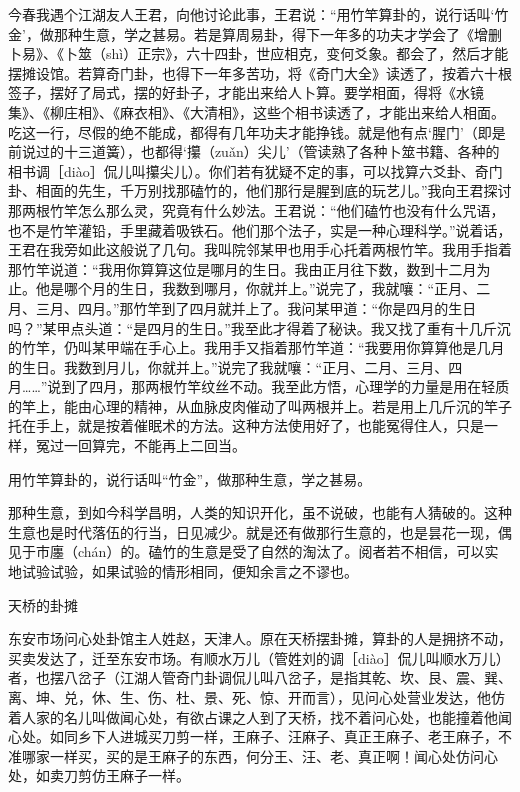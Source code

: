 \documentclass[12pt,UTF8]{ctexbook}
\begin{document}
今春我遇个江湖友人王君，向他讨论此事，王君说：“用竹竿算卦的，说行话叫‘竹金’，做那种生意，学之甚易。若是算周易卦，得下一年多的功夫才学会了《增删卜易》、《卜筮（shì）正宗》，六十四卦，世应相克，变何爻象。都会了，然后才能摆摊设馆。若算奇门卦，也得下一年多苦功，将《奇门大全》读透了，按着六十根签子，摆好了局式，摆的好卦子，才能出来给人卜算。要学相面，得将《水镜集》、《柳庄相》、《麻衣相》、《大清相》，这些个相书读透了，才能出来给人相面。吃这一行，尽假的绝不能成，都得有几年功夫才能挣钱。就是他有点‘腥门’（即是前说过的十三道簧），也都得‘攥（zuǎn）尖儿’（管读熟了各种卜筮书籍、各种的相书调［diào］侃儿叫攥尖儿）。你们若有犹疑不定的事，可以找算六爻卦、奇门卦、相面的先生，千万别找那磕竹的，他们那行是腥到底的玩艺儿。”我向王君探讨那两根竹竿怎么那么灵，究竟有什么妙法。王君说：“他们磕竹也没有什么咒语，也不是竹竿灌铅，手里藏着吸铁石。他们那个法子，实是一种心理科学。”说着话，王君在我旁如此这般说了几句。我叫院邻某甲也用手心托着两根竹竿。我用手指着那竹竿说道：“我用你算算这位是哪月的生日。我由正月往下数，数到十二月为止。他是哪个月的生日，我数到哪月，你就并上。”说完了，我就嚷：“正月、二月、三月、四月。”那竹竿到了四月就并上了。我问某甲道：“你是四月的生日吗？”某甲点头道：“是四月的生日。”我至此才得着了秘诀。我又找了重有十几斤沉的竹竿，仍叫某甲端在手心上。我用手又指着那竹竿道：“我要用你算算他是几月的生日。我数到月儿，你就并上。”说完了我就嚷：“正月、二月、三月、四月……”说到了四月，那两根竹竿纹丝不动。我至此方悟，心理学的力量是用在轻质的竿上，能由心理的精神，从血脉皮肉催动了叫两根并上。若是用上几斤沉的竿子托在手上，就是按着催眠术的方法。这种方法使用好了，也能冤得住人，只是一样，冤过一回算完，不能再上二回当。

用竹竿算卦的，说行话叫“竹金”，做那种生意，学之甚易。



那种生意，到如今科学昌明，人类的知识开化，虽不说破，也能有人猜破的。这种生意也是时代落伍的行当，日见减少。就是还有做那行生意的，也是昙花一现，偶见于市廛（chán）的。磕竹的生意是受了自然的淘汰了。阅者若不相信，可以实地试验试验，如果试验的情形相同，便知余言之不谬也。





天桥的卦摊


东安市场问心处卦馆主人姓赵，天津人。原在天桥摆卦摊，算卦的人是拥挤不动，买卖发达了，迁至东安市场。有顺水万儿（管姓刘的调［diào］侃儿叫顺水万儿）者，也摆八岔子（江湖人管奇门卦调侃儿叫八岔子，是指其乾、坎、艮、震、巽、离、坤、兑，休、生、伤、杜、景、死、惊、开而言），见问心处营业发达，他仿着人家的名儿叫做闻心处，有欲占课之人到了天桥，找不着问心处，也能撞着他闻心处。如同乡下人进城买刀剪一样，王麻子、汪麻子、真正王麻子、老王麻子，不准哪家一样买，买的是王麻子的东西，何分王、汪、老、真正啊！闻心处仿问心处，如卖刀剪仿王麻子一样。
\end{document}
